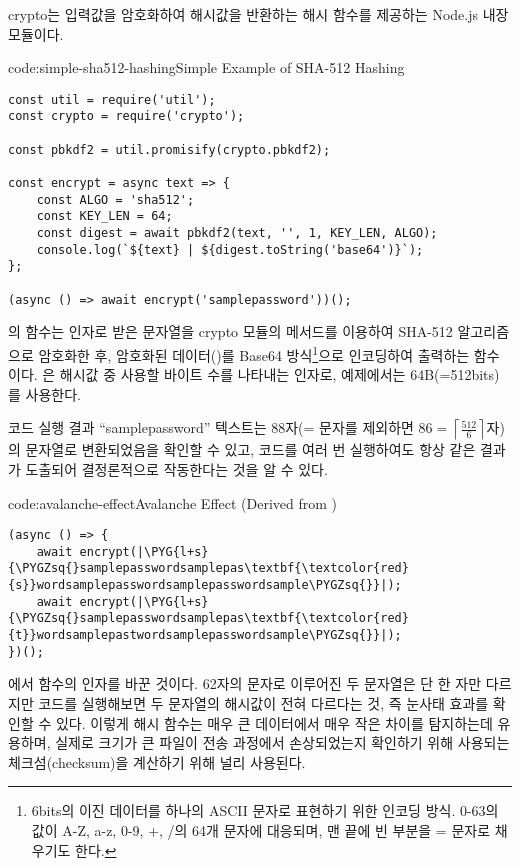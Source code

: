 crypto는 입력값을 암호화하여 해시값을 반환하는 해시 함수를 제공하는 Node.js 내장 모듈이다.

\begin{code}{code:simple-sha512-hashing}{Simple Example of SHA-512 Hashing}
\begin{verbatim}
const util = require('util');
const crypto = require('crypto');

const pbkdf2 = util.promisify(crypto.pbkdf2);

const encrypt = async text => {
    const ALGO = 'sha512';
    const KEY_LEN = 64;
    const digest = await pbkdf2(text, '', 1, KEY_LEN, ALGO);
    console.log(`${text} | ${digest.toString('base64')}`);
};

(async () => await encrypt('samplepassword'))();
\end{verbatim}
\end{code}

의  함수는 인자로 받은 문자열을 crypto 모듈의  메서드를 이용하여 SHA-512 알고리즘으로 암호화한 후, 암호화된 데이터()를 Base64 방식\footnote{6bits의 이진 데이터를 하나의 ASCII 문자로 표현하기 위한 인코딩 방식. 0-63의 값이 A-Z, a-z, 0-9, +, /의 64개 문자에 대응되며, 맨 끝에 빈 부분을 = 문자로 채우기도 한다.}으로 인코딩하여 출력하는 함수이다. 은 해시값 중 사용할 바이트 수를 나타내는 인자로, 예제에서는 64B(=512bits)를 사용한다.

코드 실행 결과 ``samplepassword'' 텍스트는 88자(= 문자를 제외하면 $86=\left\lceil\frac{512}{6}\right\rceil$자)의 문자열로 변환되었음을 확인할 수 있고, 코드를 여러 번 실행하여도 항상 같은 결과가 도출되어 결정론적으로 작동한다는 것을 알 수 있다.

\begin{code}{code:avalanche-effect}{Avalanche Effect (Derived from )}
\begin{verbatim}
(async () => {
    await encrypt(|\PYG{l+s}{\PYGZsq{}samplepasswordsamplepas\textbf{\textcolor{red}{s}}wordsamplepasswordsamplepasswordsample\PYGZsq{}}|);
    await encrypt(|\PYG{l+s}{\PYGZsq{}samplepasswordsamplepas\textbf{\textcolor{red}{t}}wordsamplepastwordsamplepasswordsample\PYGZsq{}}|);
})();
\end{verbatim}
\end{code}

\는 에서  함수의 인자를 바꾼 것이다. 62자의 문자로 이루어진 두 문자열은 단 한 자만 다르지만 코드를 실행해보면 두 문자열의 해시값이 전혀 다르다는 것, 즉 눈사태 효과를 확인할 수 있다. 이렇게 해시 함수는 매우 큰 데이터에서 매우 작은 차이를 탐지하는데 유용하며, 실제로 크기가 큰 파일이 전송 과정에서 손상되었는지 확인하기 위해 사용되는 체크섬(checksum)을 계산하기 위해 널리 사용된다.

